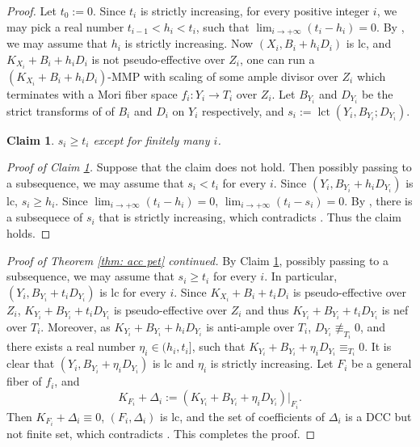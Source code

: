 \documentclass[11pt]{amsart}
\numberwithin{equation}{section}
\newcommand{\lct}{\operatorname{lct}}
\newtheorem{claim}[thm]{Claim}
\theoremstyle{definition}
\theoremstyle{definition}
\begin{document}
\begin{proof}
Let $t_0:=0$. Since $t_i$ is strictly increasing, for every positive integer $i$, we may pick a real number $t_{i-1}<h_i<t_i$, such that $\lim_{i\rightarrow+\infty}(t_i-h_i)=0$. By \cite[Lemma 5.21]{HLS19}, we may assume that $h_i$ is strictly increasing. Now $(X_i,B_i+h_iD_i)$ is lc, and $K_{X_i}+B_i+h_iD_i$ is not pseudo-effective over $Z_i$, one can run a $(K_{X_i}+B_i+h_iD_i)$-MMP with scaling of some ample divisor over $Z_i$ which terminates with a Mori fiber space $f_i: Y_i\rightarrow T_i$ over $Z_i$. Let $B_{Y_i}$ and $D_{Y_i}$ be the strict transforms of of $B_i$ and $D_i$ on $Y_i$ respectively, and $s_i:=\lct(Y_i,B_{Y_i};D_{Y_i})$. 
\begin{claim}\label{claim: lct larger than original}
$s_i\geq t_i$ except for finitely many $i$.
\end{claim}
\begin{proof}[Proof of Claim \ref{claim: lct larger than original}]
Suppose that the claim does not hold. Then possibly passing to a subsequence, we may assume that $s_i<t_i$ for every $i$. Since $(Y_i,B_{Y_i}+h_iD_{Y_i})$ is lc, $s_i\geq h_i$. Since $\lim_{i\rightarrow+\infty}(t_i-h_i)=0$, $\lim_{i\rightarrow+\infty}(t_i-s_i)=0$. By \cite[Lemma 5.21]{HLS19}, there is a subsequece of $s_i$ that is strictly increasing, which contradicts \cite[Theorem 1.4]{HMX14}. Thus the claim holds.
\end{proof}
\noindent\textit{Proof of Theorem \ref{thm: acc pet} continued.} 
By Claim \ref{claim: lct larger than original}, possibly passing to a subsequence, we may assume that $s_i\geq t_i$ for every $i$. In particular, $(Y_i,B_{Y_i}+t_iD_{Y_i})$ is lc for every $i$. Since $K_{X_i}+B_i+t_iD_i$ is pseudo-effective over $Z_i$, $K_{Y_i}+B_{Y_i}+t_iD_{Y_i}$ is pseudo-effective over $Z_i$ and thus $K_{Y_i}+B_{Y_i}+t_iD_{Y_i}$ is nef over $T_i$. Moreover, as $K_{Y_i}+B_{Y_i}+h_iD_{Y_i}$ is anti-ample over $T_i$, $D_{Y_i}\not\equiv_{T_i}0$, and there exists a real number $\eta_i\in (h_i,t_i]$, such that $K_{Y_i}+B_{Y_i}+\eta_iD_{Y_i}\equiv_{T_i}0$. It is clear that $(Y_i,B_{Y_i}+\eta_iD_{Y_i})$ is lc and $\eta_i$ is strictly increasing. Let $F_i$ be a general fiber of $f_i$, and
$$K_{F_i}+\Delta_i:=(K_{Y_i}+B_{Y_i}+\eta_iD_{Y_i})|_{F_i}.$$
Then $K_{F_i}+\Delta_i\equiv 0$, $(F_i,\Delta_i)$ is lc, and the set of coefficients of $\Delta_i$ is a DCC but not finite set, which contradicts \cite[Theorem 1.4]{HMX14}. This completes the proof.
\end{proof}
\end{document}
